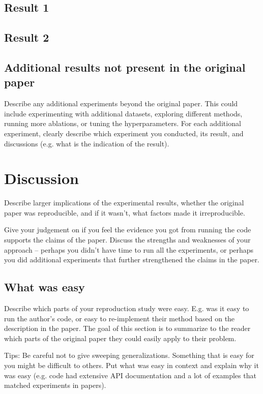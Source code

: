 \documentclass[11pt,a4paper]{article}
\begin{document}
    \subsection{Result 1}

    \subsection{Result 2}

    \subsection{Additional results not present in the original paper}

    Describe any additional experiments beyond the original paper. This could include experimenting with additional datasets, exploring different methods, running more ablations, or tuning the hyperparameters. For each additional experiment, clearly describe which experiment you conducted, its result, and discussions (e.g. what is the indication of the result).


    \section{Discussion}

    Describe larger implications of the experimental results, whether the original paper was reproducible, and if it wasn’t, what factors made it irreproducible.

    Give your judgement on if you feel the evidence you got from running the code supports the claims of the paper. Discuss the strengths and weaknesses of your approach -- perhaps you didn't have time to run all the experiments, or perhaps you did additional experiments that further strengthened the claims in the paper.

    \subsection{What was easy}
    Describe which parts of your reproduction study were easy. E.g. was it easy to run the author's code, or easy to re-implement their method based on the description in the paper. The goal of this section is to summarize to the reader which parts of the original paper they could easily apply to their problem.

    Tips: Be careful not to give sweeping generalizations. Something that is easy for you might be difficult to others. Put what was easy in context and explain why it was easy (e.g. code had extensive API documentation and a lot of examples that matched experiments in papers).
\end{document}
